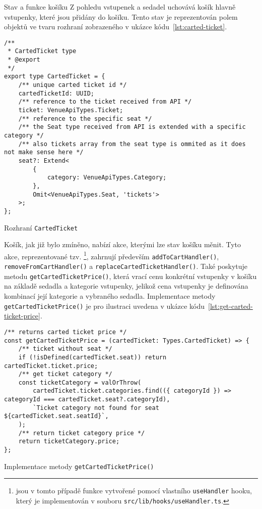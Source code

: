 \begin{subsection}{Stav a funkce košíku}
    \label{subsec:implementace-kosik-stav}
    Z pohledu vstupenek a sedadel uchovává košík hlavně vstupenky, které jsou přidány do košíku.
    Tento stav je reprezentován polem objektů ve tvaru rozhraní zobrazeného v ukázce kódu~\ref{lst:carted-ticket}.

    \begin{listing}[H]
        \begin{verbatim}
/**
 * CartedTicket type
 * @export
 */
export type CartedTicket = {
	/** unique carted ticket id */
	cartedTicketId: UUID;
	/** reference to the ticket received from API */
	ticket: VenueApiTypes.Ticket;
	/** reference to the specific seat */
	/** the Seat type received from API is extended with a specific category */
	/** also tickets array from the seat type is ommited as it does not make sense here */
	seat?: Extend<
		{
			category: VenueApiTypes.Category;
		},
		Omit<VenueApiTypes.Seat, 'tickets'>
	>;
};
        \end{verbatim}
        \caption{Rozhraní \texttt{CartedTicket}}
        \label{lst:carted-ticket}
    \end{listing}

    Košík, jak již bylo zmíněno, nabízí akce, kterými lze stav košíku měnit.
    Tyto akce, reprezentované tzv. \footnote{ jsou v tomto případě funkce vytvořené pomocí vlastního \texttt{useHandler} hooku, který je implementován v souboru \texttt{src/lib/hooks/useHandler.ts}.}, zahrnují především \texttt{addToCartHandler()}, \texttt{removeFromCartHandler()} a \texttt{replaceCartedTicketHandler()}.
    Také poskytuje metodu \texttt{getCartedTicketPrice()}, která vrací cenu konkrétní vstupenky v košíku na základě sedadla a kategorie vstupenky, jelikož cena vstupenky je definována kombinací její kategorie a vybraného sedadla.
    Implementace metody \linebreak\texttt{getCartedTicketPrice()} je pro ilustraci uvedena v ukázce kódu~\ref{lst:get-carted-ticket-price}.

    \begin{listing}[H]
        \begin{verbatim}
/** returns carted ticket price */
const getCartedTicketPrice = (cartedTicket: Types.CartedTicket) => {
	/** ticket without seat */
	if (!isDefined(cartedTicket.seat)) return cartedTicket.ticket.price;
	/** get ticket category */
	const ticketCategory = valOrThrow(
		cartedTicket.ticket.categories.find(({ categoryId }) => categoryId === cartedTicket.seat?.categoryId),
		`Ticket category not found for seat ${cartedTicket.seat.seatId}`,
	);
	/** return ticket category price */
	return ticketCategory.price;
};
        \end{verbatim}
        \caption{Implementace metody \texttt{getCartedTicketPrice()}}
        \label{lst:get-carted-ticket-price}
    \end{listing}


\end{subsection}
